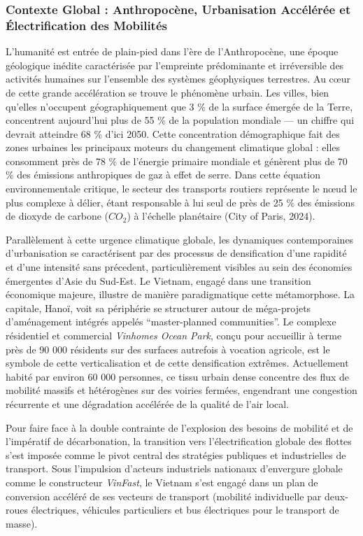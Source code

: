\documentclass[11pt, a4paper]{article}
\begin{document}
\subsubsection{Contexte Global : Anthropocène, Urbanisation Accélérée et
Électrification des
Mobilités}\label{contexte-global-anthropocuxe8ne-urbanisation-accuxe9luxe9ruxe9e-et-uxe9lectrification-des-mobilituxe9s}

L'humanité est entrée de plain-pied dans l'ère de l'Anthropocène, une
époque géologique inédite caractérisée par l'empreinte prédominante et
irréversible des activités humaines sur l'ensemble des systèmes
géophysiques terrestres. Au cœur de cette grande accélération se trouve
le phénomène urbain. Les villes, bien qu'elles n'occupent
géographiquement que 3 \% de la surface émergée de la Terre, concentrent
aujourd'hui plus de 55 \% de la population mondiale --- un chiffre qui
devrait atteindre 68 \% d'ici 2050. Cette concentration démographique
fait des zones urbaines les principaux moteurs du changement climatique
global : elles consomment près de 78 \% de l'énergie primaire mondiale
et génèrent plus de 70 \% des émissions anthropiques de gaz à effet de
serre. Dans cette équation environnementale critique, le secteur des
transports routiers représente le nœud le plus complexe à délier, étant
responsable à lui seul de près de 25 \% des émissions de dioxyde de
carbone (\(CO_2\)) à l'échelle planétaire (City of Paris, 2024).

Parallèlement à cette urgence climatique globale, les dynamiques
contemporaines d'urbanisation se caractérisent par des processus de
densification d'une rapidité et d'une intensité sans précedent,
particulièrement visibles au sein des économies émergentes d'Asie du
Sud-Est. Le Vietnam, engagé dans une transition économique majeure,
illustre de manière paradigmatique cette métamorphose. La capitale,
Hanoï, voit sa périphérie se structurer autour de méga-projets
d'aménagement intégrés appelés ``master-planned communities''. Le
complexe résidentiel et commercial \emph{Vinhomes Ocean Park}, conçu
pour accueillir à terme près de 90 000 résidents sur des surfaces
autrefois à vocation agricole, est le symbole de cette verticalisation
et de cette densification extrêmes. Actuellement habité par environ 60
000 personnes, ce tissu urbain dense concentre des flux de mobilité
massifs et hétérogènes sur des voiries fermées, engendrant une
congestion récurrente et une dégradation accélérée de la qualité de
l'air local.

Pour faire face à la double contrainte de l'explosion des besoins de
mobilité et de l'impératif de décarbonation, la transition vers
l'électrification globale des flottes s'est imposée comme le pivot
central des stratégies publiques et industrielles de transport. Sous
l'impulsion d'acteurs industriels nationaux d'envergure globale comme le
constructeur \emph{VinFast}, le Vietnam s'est engagé dans un plan de
conversion accéléré de ses vecteurs de transport (mobilité individuelle
par deux-roues électriques, véhicules particuliers et bus électriques
pour le transport de masse).
\end{document}
